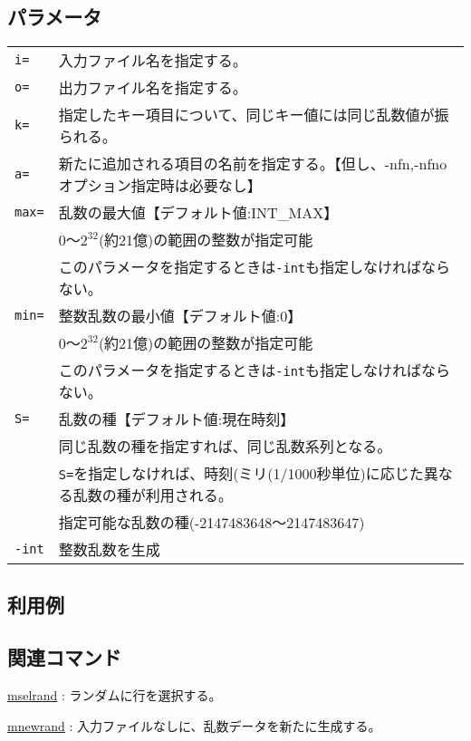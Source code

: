 \subsection*{パラメータ}
\begin{table}[htbp]
{\small
\begin{tabular}{ll}
\verb|i=|    & 入力ファイル名を指定する。\\
\verb|o=|    & 出力ファイル名を指定する。\\
\verb|k=|   & 指定したキー項目について、同じキー値には同じ乱数値が振られる。\\
\verb|a=|   & 新たに追加される項目の名前を指定する。【但し、-nfn,-nfnoオプション指定時は必要なし】\\
\verb|max=| & 乱数の最大値【デフォルト値:INT\_MAX】\\
            & 0〜$2^{32}$(約21億)の範囲の整数が指定可能\\
            & このパラメータを指定するときは\verb|-int|も指定しなければならない。\\
\verb|min=| & 整数乱数の最小値【デフォルト値:0】\\
            & 0〜$2^{32}$(約21億)の範囲の整数が指定可能\\
            & このパラメータを指定するときは\verb|-int|も指定しなければならない。\\
\verb|S=|   & 乱数の種【デフォルト値:現在時刻】\\
            & 同じ乱数の種を指定すれば、同じ乱数系列となる。\\
            & \verb|S=|を指定しなければ、時刻(ミリ(1/1000秒単位)に応じた異なる乱数の種が利用される。\\
            & 指定可能な乱数の種(-2147483648〜2147483647)\\
\verb|-int| & 整数乱数を生成\\
\end{tabular} 
}
\end{table} 

\subsection*{利用例}


\subsection*{関連コマンド}
\hyperref[sect:mselrand] {mselrand} : ランダムに行を選択する。

\hyperref[sect:mnewrand] {mnewrand} : 入力ファイルなしに、乱数データを新たに生成する。


%
